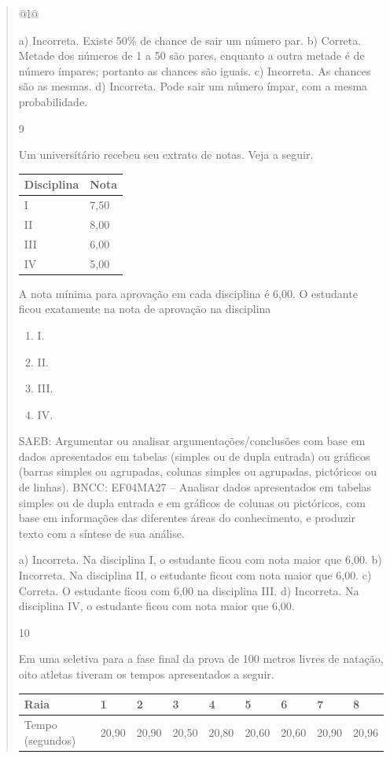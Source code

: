 \begin{mdframed}[linewidth=2pt,linecolor=salmao,roundcorner=2pt]
\begin{itemize}
{\begin{itemize}
\begin{escolha}
{\begin{quote}
{\begin{escolha}
{{{{{\begin{longtable}[]{@{}l@{}}
\begin{itemize}
{a) Incorreta. Existe 50\% de chance de sair um número par.
b) Correta. Metade dos números de 1 a 50 são pares, enquanto a outra metade é de número ímpares; portanto as chances são iguais.
c) Incorreta. As chances são as mesmas.
d) Incorreta. Pode sair um número ímpar, com a mesma probabilidade.

\num{9}

Um universítário recebeu seu extrato de notas. Veja a seguir.

\begin{longtable}[]{@{}ll@{}}
\toprule
Disciplina & Nota\tabularnewline
\midrule
\endhead
I & 7,50\tabularnewline
II & 8,00\tabularnewline
III & 6,00\tabularnewline
IV & 5,00\tabularnewline
\bottomrule
\end{longtable}

A nota mínima para aprovação em cada disciplina é 6,00. O estudante ficou exatamente na nota de aprovação na disciplina

\begin{enumerate}
\item
  I.
\item
  II.
\item
  III.
\item
  IV.
\end{enumerate}

SAEB: Argumentar ou analisar argumentações/conclusões com
base em dados apresentados em tabelas (simples ou de dupla entrada) ou
gráficos (barras simples ou agrupadas, colunas simples ou agrupadas,
pictóricos ou de linhas).
BNCC: EF04MA27 -- Analisar dados apresentados em tabelas simples ou de dupla entrada e em gráficos de
colunas ou pictóricos, com base em informações das diferentes áreas do conhecimento, e produzir
texto com a síntese de sua análise.

a) Incorreta. Na disciplina I, o estudante ficou com nota maior que 6,00.
b) Incorreta. Na disciplina II, o estudante ficou com nota maior que 6,00.
c) Correta. O estudante ficou com 6,00 na disciplina III.
d) Incorreta. Na disciplina IV, o estudante ficou com nota maior que 6,00.

\num{10}

Em uma seletiva para a fase final da prova de 100 metros livres de
natação, oito atletas tiveram os tempos apresentados a seguir.

\begin{longtable}[]{@{}ll@{}}
\toprule
Raia & 1 & 2 & 3 & 4 & 5 & 6 & 7 & 8\tabularnewline
\midrule
\endhead
Tempo (segundos) & 20,90 & 20,90 & 20,50 & 20,80 & 20,60 & 20,60 & 20,90 & 20,96\tabularnewline
\bottomrule
\end{longtable}

}
\end{itemize}
\end{longtable}}}}}}
\end{escolha}}
\end{quote}}
\end{escolha}
\end{itemize}}
\end{itemize}
\end{mdframed}
